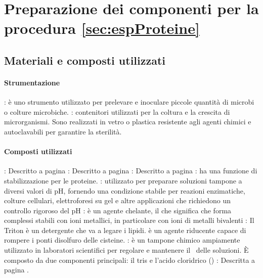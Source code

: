 \section{Preparazione dei componenti per la procedura \ref*{sec:espProteine}}

\subsection{Materiali e composti utilizzati}
\begingroup
{}
\paragraph{Strumentazione}
\begin{itemize}
	\itemb[Ansa]: è uno strumento utilizzato per prelevare e inoculare piccole quantità di microbi o colture microbiche.
	: contenitori utilizzati per la coltura e la crescita di microrganismi. Sono realizzati in vetro o plastica resistente agli agenti chimici e autoclavabili per garantire la sterilità.
\end{itemize}

\paragraph{Composti utilizzati}
\begin{itemize}\label{it:compostiUtilizzatiRel8}
	: Descritto a pagina \pageref{it:prepLBsolido-CompostiUtilizzati}
	: Descritto a pagina \pageref{it:prepLBsolido-CompostiUtilizzati}
	: Descritto a pagina \pageref{it:prepLBsolido-CompostiUtilizzati}
	\itemb[Saccarosio]: ha una funzione di stabilizzazione per le proteine.
	: utilizzato per preparare soluzioni tampone a diversi valori di pH, fornendo una condizione stabile per reazioni enzimatiche, colture cellulari, elettroforesi su gel e altre applicazioni che richiedono un controllo rigoroso del pH
	: è un agente chelante, il che significa che forma complessi stabili con ioni metallici, in particolare con ioni di metalli bivalenti
	\itemb[Triton X-100]: Il Triton è un detergente che va a legare i lipidi.
	 è un agente riducente capace di rompere i ponti disolfuro delle cisteine.
	: è un tampone chimico ampiamente utilizzato in laboratori scientifici per regolare e mantenere il \pH\ delle soluzioni. È composto da due componenti principali: il \gls{tris} e l'acido cloridrico ()
	\itemb[Ampicillina]: Descritta a pagina \pageref{it:prepLBsolido-CompostiUtilizzati}.
\end{itemize}

